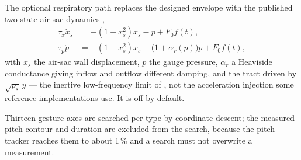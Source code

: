 \documentclass[10pt,twocolumn,a4paper]{article}
\begin{document}
The optional respiratory path replaces the designed envelope with the published two-state
air-sac dynamics \citep{fainstein2025},
\begin{align}
\tau_x \dot{x}_s &= -(1 + x_s^{2})x_s - p + F_0 f(t), \\
\tau_p \dot{p}   &= -(1 + x_s^{2})x_s - \bigl(1 + \alpha_r(p)\bigr)p + F_0 f(t),
\end{align}
with $x_s$ the air-sac wall displacement, $p$ the gauge pressure, $\alpha_r$ a Heaviside
conductance giving inflow and outflow different damping, and the tract driven by
$\sqrt{p_s}\,y$ --- the inertive low-frequency limit of \citet{laje2005}, not the acceleration
injection some reference implementations use. It is off by default.

Thirteen gesture axes are searched per type by coordinate descent; the measured pitch contour
and duration are excluded from the search, because the pitch tracker reaches them to about
1\,\% and a search must not overwrite a measurement.
\end{document}
